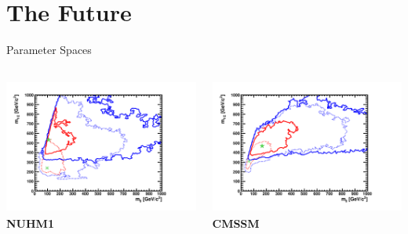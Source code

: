 \documentclass{beamer}
\begin{document}
\section{The Future}
\begin{frame}{Parameter Spaces}
  \begin{columns}
    \begin{column}{0.5\textwidth}
      \includegraphics[height=4.5cm]{m0m12/nuhm1.pdf}\\
      \textbf{NUHM1}
    \end{column}
    \begin{column}{0.5\textwidth}
      \includegraphics[height=4.5cm]{m0m12/cmssm.pdf}\\
      \textbf{CMSSM}
    \end{column}
  \end{columns}
\end{frame}
\end{document}
